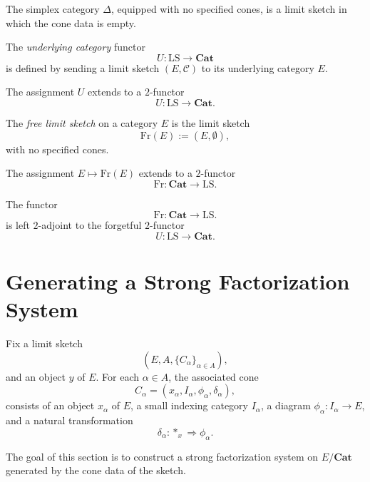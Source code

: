 \documentclass{tac}
\newcommand{\free}{\mathrm{Fr}}
\newcommand{\limsk}{\mathrm{LS}}
\begin{document}
\begin{example}
The simplex category $\Delta$, equipped with no specified cones, is a limit sketch in which the cone data is empty.
\end{example}

\begin{notation}\label{und_cat}
The \emph{underlying category} functor
\[
U : \limsk \to \mathbf{Cat}
\]
is defined by sending a limit sketch $(E,\mathcal{C})$ to its underlying category $E$.
\end{notation}

\begin{lemma}
The assignment $U$ extends to a $2$-functor
\[
U : \limsk \to \mathbf{Cat}.
\]
\end{lemma}

\begin{notation}\label{free_lim_sk}
The \emph{free limit sketch} on a category $E$ is the limit sketch
\[
\free(E) := (E, \emptyset),
\]
with no specified cones.
\end{notation}

\begin{lemma}
The assignment $E \mapsto \free(E)$ extends to a $2$-functor
\[
\free : \mathbf{Cat} \to \limsk.
\]
\end{lemma}

\begin{lemma}
The functor 
\[
\free : \mathbf{Cat} \to \limsk.
\]
is left $2$-adjoint to the forgetful $2$-functor
\[
U : \limsk \to \mathbf{Cat}.
\]
\end{lemma}

\section{Generating a Strong Factorization System}

Fix a limit sketch
\[
(E,A,\{C_\alpha\}_{\alpha \in A}),
\]
and an object $y$ of $E$. For each $\alpha \in A$, the associated cone
\[
C_\alpha = (x_\alpha, I_\alpha, \phi_\alpha, \delta_\alpha),
\]
consists of an object $x_\alpha$ of $E$, a small indexing category $I_\alpha$, a diagram $\phi_\alpha : I_\alpha \to E$, and
a natural transformation
\[
\delta_\alpha : *_x \Rightarrow \phi_\alpha.
\]
\medskip

The goal of this section is to construct a strong factorization system on $E/\mathbf{Cat}$ generated by the cone data of the sketch.
\end{document}
